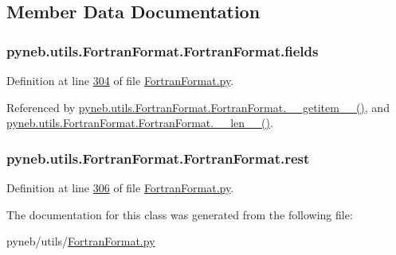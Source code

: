 \subsection{Member Data Documentation}
\hypertarget{classpyneb_1_1utils_1_1_fortran_format_1_1_fortran_format_ac8f962282ba9e35ccd8dad5feacd3813}{
\subsubsection[{fields}]{\setlength{\rightskip}{0pt plus 5cm}pyneb.\-utils.\-Fortran\-Format.\-Fortran\-Format.\-fields}}\label{classpyneb_1_1utils_1_1_fortran_format_1_1_fortran_format_ac8f962282ba9e35ccd8dad5feacd3813}


Definition at line \hyperlink{_fortran_format_8py_source_l00304}{304} of file \hyperlink{_fortran_format_8py_source}{Fortran\-Format.\-py}.



Referenced by \hyperlink{_fortran_format_8py_source_l00311}{pyneb.\-utils.\-Fortran\-Format.\-Fortran\-Format.\-\_\-\-\_\-getitem\-\_\-\-\_\-()}, and \hyperlink{_fortran_format_8py_source_l00308}{pyneb.\-utils.\-Fortran\-Format.\-Fortran\-Format.\-\_\-\-\_\-len\-\_\-\-\_\-()}.

\hypertarget{classpyneb_1_1utils_1_1_fortran_format_1_1_fortran_format_a6567d6b3709b1db086972c2fe1855006}{
\subsubsection[{rest}]{\setlength{\rightskip}{0pt plus 5cm}pyneb.\-utils.\-Fortran\-Format.\-Fortran\-Format.\-rest}}\label{classpyneb_1_1utils_1_1_fortran_format_1_1_fortran_format_a6567d6b3709b1db086972c2fe1855006}


Definition at line \hyperlink{_fortran_format_8py_source_l00306}{306} of file \hyperlink{_fortran_format_8py_source}{Fortran\-Format.\-py}.



The documentation for this class was generated from the following file\-:\begin{DoxyCompactItemize}
\item 
pyneb/utils/\hyperlink{_fortran_format_8py}{Fortran\-Format.\-py}\end{DoxyCompactItemize}
